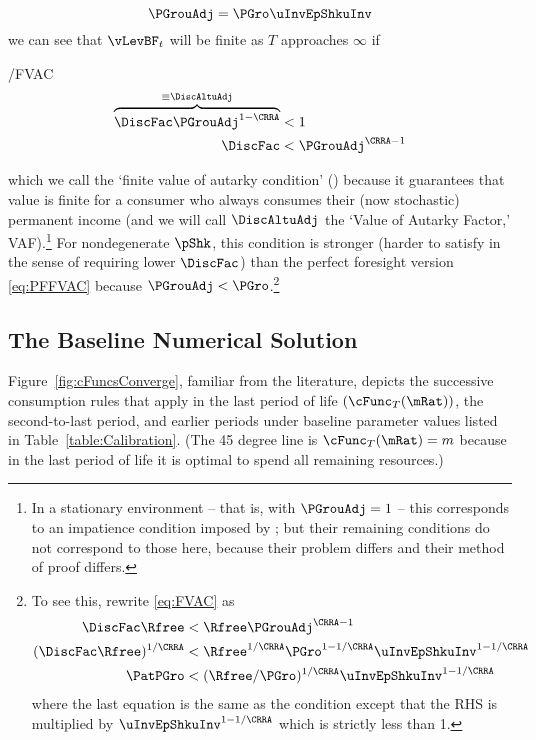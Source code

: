 \documentclass[BufferStockTheory]{subfiles}
\providecommand{\LtxDir}{LaTeX/}
\begin{document}
\begin{equation}
  \label{eq:PGrouAdj}
  \PGrouAdj = \PGro \uInvEpShkuInv 
\end{equation}
we can see that $\vLevBF_{t}$ will be finite 
as $T$ approaches $\infty$ if\hypertarget{FVAC}{}
\begin{verbatimwrite}{\EqDir/FVAC}
  \begin{align}
    \overbrace{\DiscFac \PGrouAdj^{1-\CRRA} }^{\equiv \DiscAltuAdj}  & < 1 \notag
    \\ \DiscFac  & < \PGrouAdj^{\CRRA-1} \label{eq:FVAC}
  \end{align}
\end{verbatimwrite}

which we call the `finite value of autarky condition' \hypertarget{FVAC}{}
(\FVAC) because it guarantees that value is finite for a consumer who always consumes their 
(now stochastic) permanent income (and we will call $\DiscAltuAdj$ the `Value of Autarky Factor,' VAF).\footnote{In a stationary environment -- that is, with $\PGrouAdj=1$ -- this corresponds to an impatience condition imposed by \cite{mstIncFluct}; but their remaining conditions do not correspond to those here, because their problem differs and their method of proof differs.}  For nondegenerate $\pShk$, this 
condition is stronger
(harder to satisfy in the sense of requiring lower $\DiscFac$) than
the perfect foresight version \eqref{eq:PFFVAC} because $\PGrouAdj <
\PGro$.\footnote{To see this, rewrite \eqref{eq:FVAC} as 
  \begin{align*}
    \DiscFac \Rfree & < \Rfree \PGrouAdj^{\CRRA-1}
    \\ (\DiscFac \Rfree)^{1/\CRRA}  & < \Rfree^{1/\CRRA} \PGro^{1-1/\CRRA} \uInvEpShkuInv^{1-1/\CRRA} 
    \\ \PatPGro & < (\Rfree/\PGro)^{1/\CRRA} \uInvEpShkuInv^{1-1/\CRRA}
  \end{align*}
  where the last equation is the same as the {\PFFVAC} condition except that the 
  RHS is multiplied by $\uInvEpShkuInv^{1-1/\CRRA}$ which is strictly less than 1.}


\hypertarget{Baseline-Numerical-Solution}{}
\subsection{The Baseline Numerical Solution}

Figure~\ref{fig:cFuncsConverge}, familiar from the literature, depicts the successive consumption
rules that apply in the last period of life $(\cFunc_{T}(\mRat))$, the
second-to-last period, and earlier periods under baseline parameter values listed in Table~\ref{table:Calibration}.  (The 45 degree line is $\cFunc_{T}(\mRat) = m$ because in
the last period of life it is optimal to spend all remaining
resources.)
\end{document}

